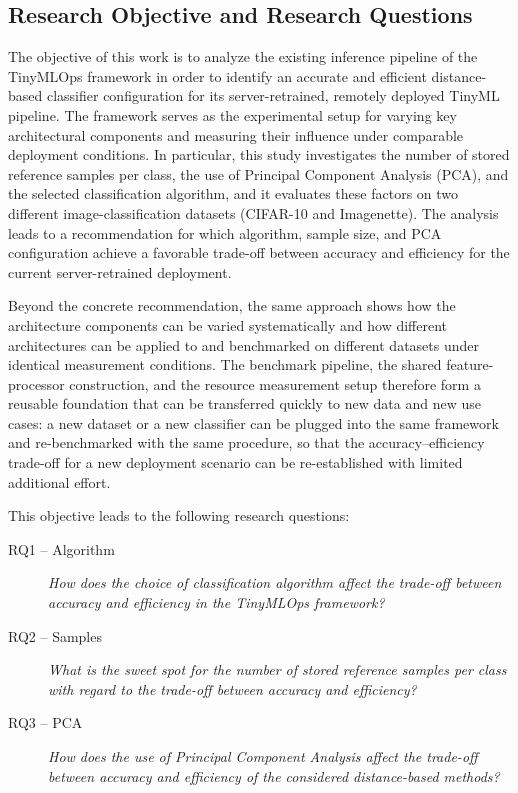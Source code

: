 \documentclass[sigconf,review,nonacm]{acmart}
\begin{document}
\subsection{Research Objective and Research Questions}
The objective of this work is to analyze the existing inference pipeline of the TinyMLOps framework in order to identify an accurate and efficient distance-based classifier configuration for its server-retrained, remotely deployed TinyML pipeline.
The framework serves as the experimental setup for varying key architectural components and measuring their influence under comparable deployment conditions.
In particular, this study investigates the number of stored reference samples per class, the use of Principal Component Analysis (PCA), and the selected classification algorithm, and it evaluates these factors on two different image-classification datasets (CIFAR-10 and Imagenette).
The analysis leads to a recommendation for which algorithm, sample size, and PCA configuration achieve a favorable trade-off between accuracy and efficiency for the current server-retrained deployment.

Beyond the concrete recommendation, the same approach shows how the architecture components can be varied systematically and how different architectures can be applied to and benchmarked on different datasets under identical measurement conditions.
The benchmark pipeline, the shared feature-processor construction, and the resource measurement setup therefore form a reusable foundation that can be transferred quickly to new data and new use cases: a new dataset or a new classifier can be plugged into the same framework and re-benchmarked with the same procedure, so that the accuracy--efficiency trade-off for a new deployment scenario can be re-established with limited additional effort.

This objective leads to the following research questions:

\begin{description}
  \item[RQ1 -- Algorithm] \emph{How does the choice of classification algorithm affect the trade-off between accuracy and efficiency in the TinyMLOps framework?}
  \item[RQ2 -- Samples] \emph{What is the sweet spot for the number of stored reference samples per class with regard to the trade-off between accuracy and efficiency?}
  \item[RQ3 -- PCA] \emph{How does the use of Principal Component Analysis affect the trade-off between accuracy and efficiency of the considered distance-based methods?}
\end{description}
\end{document}
